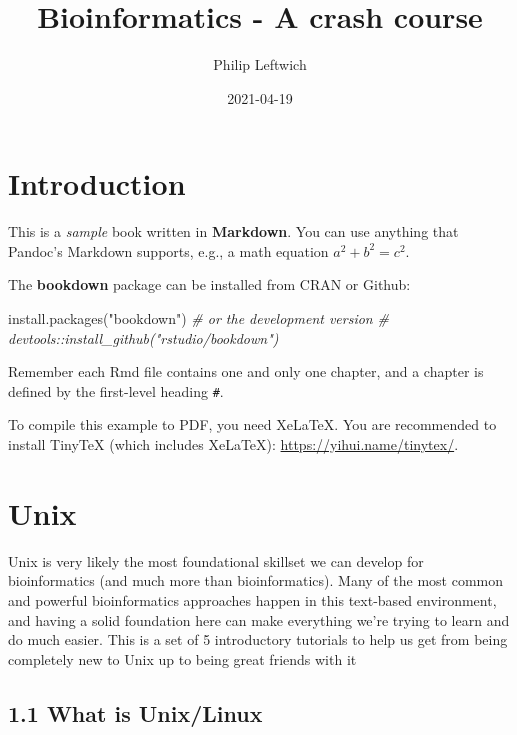 \documentclass[
]{book}
\title{Bioinformatics - A crash course}
\author{Philip Leftwich}
\date{2021-04-19}
\newenvironment{Shaded}{\begin{snugshade}}{\end{snugshade}}
\newcommand{\CommentTok}[1]{\textcolor[rgb]{0.56,0.35,0.01}{\textit{#1}}}
\newcommand{\FunctionTok}[1]{\textcolor[rgb]{0.00,0.00,0.00}{#1}}
\newcommand{\NormalTok}[1]{#1}
\newcommand{\StringTok}[1]{\textcolor[rgb]{0.31,0.60,0.02}{#1}}
\begin{document}
\maketitle

{
\setcounter{tocdepth}{1}
\tableofcontents
}
\hypertarget{introduction}{%
\chapter{Introduction}\label{introduction}}

This is a \emph{sample} book written in \textbf{Markdown}. You can use anything that Pandoc's Markdown supports, e.g., a math equation \(a^2 + b^2 = c^2\).

The \textbf{bookdown} package can be installed from CRAN or Github:

\begin{Shaded}
\begin{Highlighting}[]
\FunctionTok{install.packages}\NormalTok{(}\StringTok{"bookdown"}\NormalTok{)}
\CommentTok{\# or the development version}
\CommentTok{\# devtools::install\_github("rstudio/bookdown")}
\end{Highlighting}
\end{Shaded}

Remember each Rmd file contains one and only one chapter, and a chapter is defined by the first-level heading \texttt{\#}.

To compile this example to PDF, you need XeLaTeX. You are recommended to install TinyTeX (which includes XeLaTeX): \url{https://yihui.name/tinytex/}.

\hypertarget{Unix}{%
\chapter{Unix}\label{Unix}}

Unix is very likely the most foundational skillset we can develop for bioinformatics (and much more than bioinformatics). Many of the most common and powerful bioinformatics approaches happen in this text-based environment, and having a solid foundation here can make everything we're trying to learn and do much easier. This is a set of 5 introductory tutorials to help us get from being completely new to Unix up to being great friends with it 🙂

\hypertarget{what-is-unixlinux}{%
\section{1.1 What is Unix/Linux}\label{what-is-unixlinux}}
\end{document}
